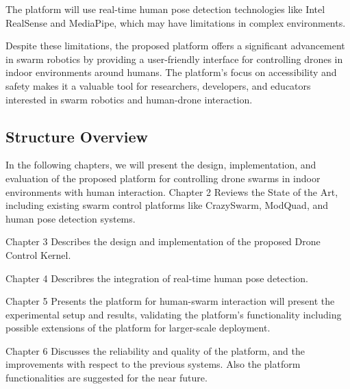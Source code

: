 The platform will use real-time human pose detection technologies like Intel RealSense and MediaPipe, which may have limitations in complex environments.

Despite these limitations, the proposed platform offers a significant advancement in swarm robotics by providing a user-friendly interface for controlling drones in indoor environments around humans. The platform's focus on accessibility and safety makes it a valuable tool for researchers, developers, and educators interested in swarm robotics and human-drone interaction.

\subsection{Structure Overview}
In the following chapters, we will present the design, implementation, and evaluation of the proposed platform for controlling drone swarms in indoor environments with human interaction.
    Chapter 2 Reviews the State of the Art, including existing swarm control platforms like CrazySwarm, ModQuad, and human pose detection systems.

    Chapter 3 Describes the design and implementation of the proposed Drone Control Kernel.

    Chapter 4 Describres the integration of real-time human pose detection.

    Chapter 5 Presents the platform for human-swarm interaction will present the experimental setup and results, validating the platform's functionality including possible extensions of the platform for larger-scale deployment.

    Chapter 6 Discusses the reliability and quality of the platform, and the improvements with respect to the previous systems. Also the platform functionalities are suggested for the near future.



